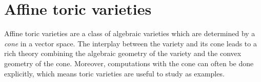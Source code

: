 \documentclass[12pt]{amsart}
\theoremstyle{plain}
\newtheorem{theorem}{Theorem}%
\newtheorem{remark}[theorem]{Remark}
\begin{document}
%
%
%


\newpage
\section{Affine toric varieties}
Affine toric varieties are a class of algebraic varieties which are determined by a \emph{cone} in a vector space.
The interplay between the variety and its cone leads to a rich theory combining the algebraic geometry of the variety and the convex geometry of the cone.
Moreover, computations with the cone can often be done explicitly, which means toric varieties are useful to study as examples.
\end{document}
